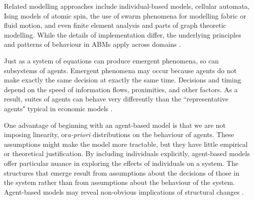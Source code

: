 Related modelling approaches include individual-based models, cellular automata, Ising models of atomic spin, the use of swarm phenomena for modelling fabric or fluid motion, and even finite element analysis and parts of graph theoretic modelling.  While the details of implementation differ, the underlying principles and patterns of behaviour in ABMs apply across domains \cite{shalizi_methods_2006}.  

Just as a system of equations can produce emergent phenomena, so can subsystems of agents. Emergent phenomena may occur because agents do not make exactly the same decision at exactly the same time. Decisions and timing depend on the speed of information flows, proximities, and other factors. As a result, suites of agents can behave very differently than the ``representative agents" typical in economic models \cite{darley_towards_1999, tesfatsion_agent-based_2002}.


One advantage of beginning with an agent-based model is that we are not imposing linearity, or\textit{a-priori} distributions on the behaviour of agents. These assumptions might make the model more tractable, but they have little empirical or theoretical justification. 
By including individuals explicitly, agent-based models offer particular nuance in exploring the effects of individuals on a system. The structures that emerge result from assumptions about the decisions of those in the system rather than from assumptions about the behaviour of the system. Agent-based models may reveal non-obvious implications of structural changes \cite{darley_towards_1999, happe_agricultural_2004}. 

